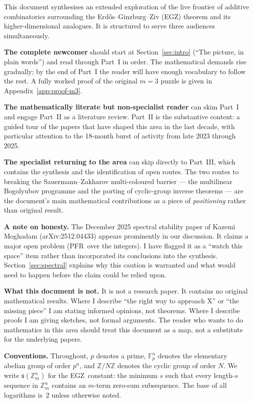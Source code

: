 \documentclass[11pt,a4paper]{article}
\theoremstyle{plain}
\theoremstyle{definition}
\theoremstyle{remark}
\newcommand{\F}{\mathbb{F}}
\newcommand{\Z}{\mathbb{Z}}
\newcommand{\sUFp}{\mathfrak{s}}
\newcommand{\PFR}{\textsf{PFR}}
\newcommand{\EGZ}{\textsf{EGZ}}
\begin{document}
This document synthesises an extended exploration of the live frontier of additive combinatorics surrounding the Erd\H{o}s--Ginzburg--Ziv (\EGZ) theorem and its higher-dimensional analogues. It is structured to serve three audiences simultaneously.

\textbf{The complete newcomer} should start at Section~\ref{sec:intro} (``The picture, in plain words'') and read through Part~I in order. The mathematical demands rise gradually; by the end of Part~I the reader will have enough vocabulary to follow the rest. A fully worked proof of the original $m=3$ puzzle is given in Appendix~\ref{app:proof-m3}.

\textbf{The mathematically literate but non-specialist reader} can skim Part~I and engage Part~II as a literature review. Part~II is the substantive content: a guided tour of the papers that have shaped this area in the last decade, with particular attention to the 18-month burst of activity from late 2023 through 2025.

\textbf{The specialist returning to the area} can skip directly to Part~III, which contains the synthesis and the identification of open routes. The two routes to breaking the Sauermann--Zakharov multi-coloured barrier --- the multilinear Bogolyubov programme and the porting of cyclic-group inverse theorems --- are the document's main mathematical contributions as a piece of \emph{positioning} rather than original result.

\textbf{A note on honesty.} The December 2025 spectral stability paper of Kazemi Moghadam (arXiv:2512.04433) appears prominently in our discussion. It claims a major open problem (\PFR\ over the integers). I have flagged it as a ``watch this space'' item rather than incorporated its conclusions into the synthesis. Section~\ref{sec:spectral} explains why this caution is warranted and what would need to happen before the claim could be relied upon.

\textbf{What this document is not.} It is not a research paper. It contains no original mathematical results. Where I describe ``the right way to approach X'' or ``the missing piece'' I am stating informed opinions, not theorems. Where I describe proofs I am giving sketches, not formal arguments. The reader who wants to do mathematics in this area should treat this document as a map, not a substitute for the underlying papers.

\textbf{Conventions.} Throughout, $p$ denotes a prime, $\F_p^n$ denotes the elementary abelian group of order $p^n$, and $\Z/N\Z$ denotes the cyclic group of order $N$. We write $\sUFp(\Z_m^n)$ for the \EGZ\ constant: the minimum $s$ such that every length-$s$ sequence in $\Z_m^n$ contains an $m$-term zero-sum subsequence. The base of all logarithms is~$2$ unless otherwise noted.
\end{document}
